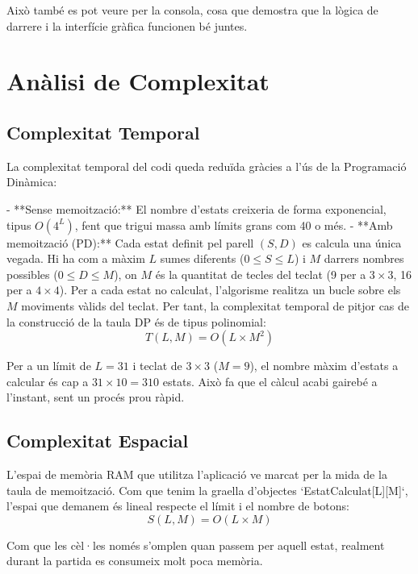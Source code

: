 \documentclass[compsoc, a4paper]{IEEEtran}
\begin{document}
Això també es pot veure per la consola, cosa que demostra que la lògica de darrere i la interfície gràfica funcionen bé juntes.

\section{Anàlisi de Complexitat}

\subsection{Complexitat Temporal}

La complexitat temporal del codi queda reduïda gràcies a l'ús de la Programació Dinàmica:

- **Sense memoització:** El nombre d'estats creixeria de forma exponencial, tipus $O(4^L)$, fent que trigui massa amb límits grans com 40 o més.
- **Amb memoització (PD):** Cada estat definit pel parell $(S, D)$ es calcula una única vegada. Hi ha com a màxim $L$ sumes diferents ($0 \le S \le L$) i $M$ darrers nombres possibles ($0 \le D \le M$), on $M$ és la quantitat de tecles del teclat (9 per a $3 \times 3$, 16 per a $4 \times 4$). 
  Per a cada estat no calculat, l'algorisme realitza un bucle sobre els $M$ moviments vàlids del teclat. Per tant, la complexitat temporal de pitjor cas de la construcció de la taula DP és de tipus polinomial:
  $$T(L, M) = O(L \times M^2)$$

Per a un límit de $L=31$ i teclat de $3 \times 3$ ($M=9$), el nombre màxim d'estats a calcular és cap a $31 \times 10 = 310$ estats. Això fa que el càlcul acabi gairebé a l'instant, sent un procés prou ràpid.

\subsection{Complexitat Espacial}

L'espai de memòria RAM que utilitza l'aplicació ve marcat per la mida de la taula de memoització. Com que tenim la graella d'objectes `EstatCalculat[L][M]`, l'espai que demanem és lineal respecte el límit i el nombre de botons:
$$S(L, M) = O(L \times M)$$

Com que les cèl·les només s'omplen quan passem per aquell estat, realment durant la partida es consumeix molt poca memòria.

\end{document}
